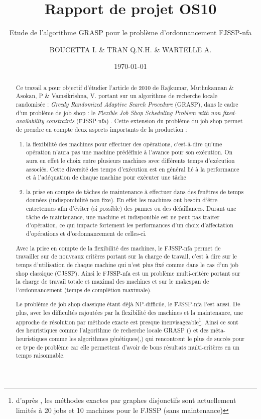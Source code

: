 \documentclass[10pt,a4paper]{scrartcl}
\author{\textsc{BOUCETTA I.} \& \textsc{TRAN Q.N.H.} \& \textsc{WARTELLE A.}}
\title{Rapport de projet OS10}
\subtitle{Etude de l'algorithme GRASP pour le problème d'ordonnancement FJSSP-nfa}
\date{\today}
\begin{document}
\maketitle
\renewcommand{\contentsname}{Sommaire}
\tableofcontents
\clearpage

\begin{abstract}
Ce travail a pour objectif d'étudier l'article de 2010 de Rajkumar, Muthukannan \& Asokan, P \& Vamsikrishna, V.
portant sur un algorithme de recherche locale randomisée : \emph{Greedy Randomized Adaptive Search Procedure} (GRASP),
dans le cadre d'un problème de job shop : le \emph{Flexible Job Shop Scheduling Problem with non fixed-availability constraints}
(FJSSP-nfa) \cite{GRASP}. 
Cette extension du problème du job shop permet de prendre en compte deux aspects importants de la production :
\begin{enumerate}
\item la flexibilité des machines pour effectuer des opérations, c'est-à-dire qu'une opération n'aura pas une machine
prédéfinie à l'avance pour son exécution. On aura en effet le choix entre plusieurs machines avec différents temps
d'exécution associés. Cette diversité des temps d'exécution est en général lié à la performance et à l'adéquation de chaque machine
pour exécuter une tâche
\item la prise en compte de tâches de maintenance à effectuer dans des fenêtres de temps données (indisponibilité non fixe). En effet
les machines ont besoin d'être entretenues afin d'éviter (si possible) des pannes ou des défaillances. Durant une
tâche de maintenance, une machine et indisponible est ne peut pas traiter d'opération, ce qui impacte fortement
les performances d'un choix d'affectation d'opérations et d'ordonnancement de celles-ci.
\end{enumerate}
Avec la prise en compte de la flexibilité des machines, le FJSSP-nfa permet de travailler sur de nouveaux
critères portant sur la charge de travail, c'est à dire sur le temps d'utilisation de chaque machine qui
n'est plus fixé comme dans le cas d'un job shop classique (CJSSP). Ainsi le FJSSP-nfa est un problème multi-critère portant
sur la charge de travail totale et maximal des machines et sur le makespan de l'ordonnancement (temps
de complétion maximale).

Le problème de job shop classique étant déjà NP-difficile, le FJSSP-nfa l'est aussi.
De plus, avec les difficultés rajoutées par la flexibilité des machines et la maintenance,
une approche de résolution par méthode exacte est presque inenvisageable\footnote{d'après \cite{GA1},
les méthodes exactes par graphes disjonctifs sont actuellement limités à 20 jobs et 10 machines pour
le FJSSP (sans maintenance)}. Ainsi ce sont des heuristiques comme l'algorithme de recherche locale GRASP (\cite{GRASP}) 
et des méta-heuristiques comme les algorithmes génétiques(\cite{GA1},\cite{GA2}) qui rencontrent le plus de succès pour ce type de problème car elle permettent d'avoir de bons résultats multi-critères  en un temps raisonnable.

\end{abstract}
\end{document}
